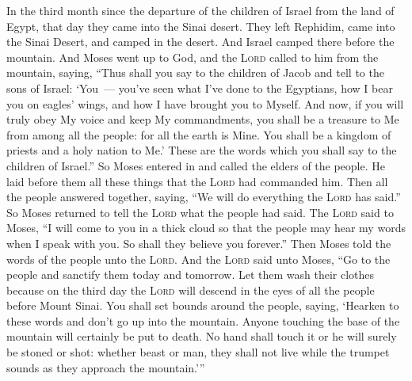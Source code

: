 
\begin{inparaenum}
     In the third month since the departure of the children of Israel from the land of Egypt, that day they came into the Sinai desert.%
     They left Rephidim, came into the Sinai Desert, and camped in the desert. And Israel camped there before the mountain.%
     And Moses went up to God, and the \textsc{Lord} called to him from the mountain, saying, ``Thus shall you say to the children of Jacob and tell to the sons of Israel:%
     `You~--- you've seen what I've done to the Egyptians, how I bear you on eagles' wings, and how I have brought you to Myself.%
     And now, if you will truly obey My voice and keep My commandments, you shall be a treasure to Me from among all the people: for all the earth is Mine.%
     You shall be a kingdom of priests and a holy nation to Me.' These are the words which you shall say to the children of Israel.''%
     So Moses entered in and called the elders of the people. He laid before them all these things that the \textsc{Lord} had commanded him.%
     Then all the people answered together, saying, ``We will do everything the \textsc{Lord} has said.'' So Moses returned to tell the \textsc{Lord} what the people had said.%
     The \textsc{Lord} said to Moses, ``I will come to you in a thick cloud so that the people may hear my words when I speak with you. So shall they believe you forever.'' Then Moses told the words of the people unto the \textsc{Lord}.%
     And the \textsc{Lord} said unto Moses, ``Go to the people and sanctify them today and tomorrow. Let them wash their clothes%
     because on the third day the \textsc{Lord} will descend in the eyes of all the people before Mount Sinai.%
     You shall set bounds around the people, saying, `Hearken to these words and don't go up into the mountain. Anyone touching the base of the mountain will certainly be put to death.%
     No hand shall touch it or he will surely be stoned or shot: whether beast or man, they shall not live while the trumpet sounds as they approach the mountain.'\thinspace''%

\end{inparaenum}
